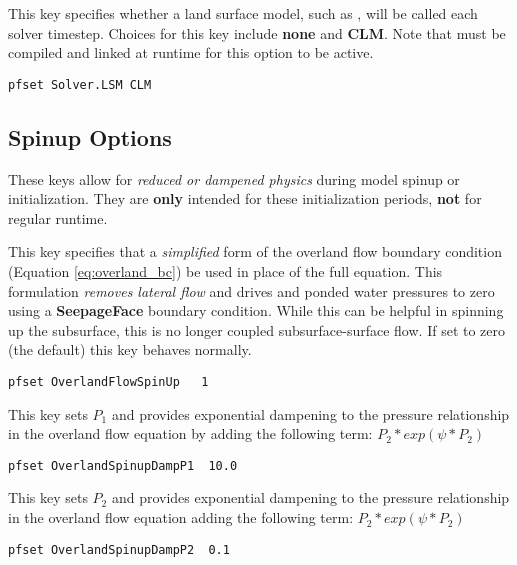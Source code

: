 {This key specifies whether a land surface model, such as , will be called each solver timestep.
Choices for this key include {\bf none} and {\bf CLM}. Note that  must be compiled and linked at runtime for this option to be active.
}
\begin{display}\begin{verbatim}
pfset Solver.LSM CLM
\end{verbatim}\end{display}


\subsection{Spinup Options}
\label{Spinup Options}

These keys allow for \emph{reduced or dampened physics} during model spinup or initialization. They are {\bf only} intended
for these initialization periods, {\bf not} for regular runtime.

{This key specifies that a \emph{simplified} form of the overland flow boundary condition (Equation \ref{eq:overland_bc}) be used in place of the full equation.
This formulation \emph{removes lateral flow} and drives and ponded water pressures to zero using a {\bf SeepageFace} boundary condition.  While this can be helpful in spinning up the subsurface,
this is no longer coupled subsurface-surface flow.  If set to zero (the default) this key behaves normally.
}
\begin{display}\begin{verbatim}
pfset OverlandFlowSpinUp   1
\end{verbatim}\end{display}

{This key sets $P_1$ and provides exponential dampening to the pressure relationship in the overland flow equation by adding the
following term: $P_2*exp(\psi*P_2)$}
\begin{display}\begin{verbatim}
pfset OverlandSpinupDampP1  10.0
\end{verbatim}\end{display}

{This key sets $P_2$ and provides exponential dampening to the pressure relationship in the overland flow equation adding the
following term: $P_2*exp(\psi*P_2)$ }
\begin{display}\begin{verbatim}
pfset OverlandSpinupDampP2  0.1
\end{verbatim}\end{display}

